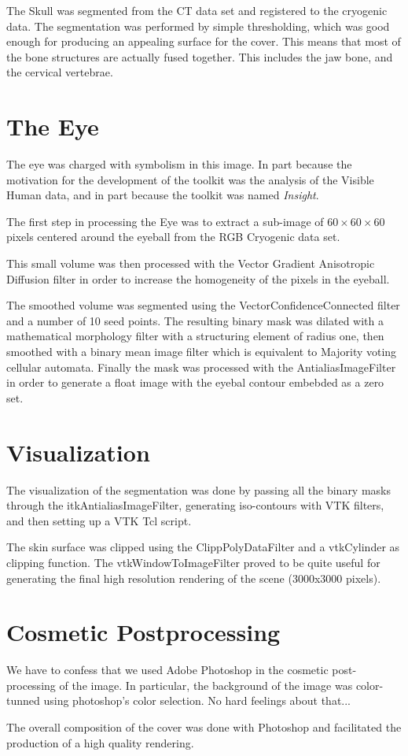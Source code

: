 The Skull was segmented from the CT data set and registered to the cryogenic
data. The segmentation was performed by simple thresholding, which was good
enough for producing an appealing surface for the cover. This means that most
of the bone structures are actually fused together. This includes the jaw bone,
and the cervical vertebrae.

\section*{The Eye} 

The eye was charged with symbolism in this image. In part because the
motivation for the development of the toolkit was the analysis of the Visible
Human data, and in part because the toolkit was named \emph{Insight}.

The first step in processing the Eye was to extract a sub-image of
$60\times60\times60$ pixels centered around the eyeball from the RGB Cryogenic
data set.

This small volume was then processed with the Vector Gradient Anisotropic
Diffusion filter in order to increase the homogeneity of the pixels in the 
eyeball.

The smoothed volume was segmented using the VectorConfidenceConnected filter
and a number of 10 seed points. The resulting binary mask was dilated with 
a mathematical morphology filter with a structuring element of radius one, then
smoothed with a binary mean image filter which is equivalent to Majority voting
cellular automata. Finally the mask was processed with the AntialiasImageFilter
in order to generate a float image with the eyebal contour embebded as a zero
set.


\section*{Visualization}

The visualization of the segmentation was done by passing all the binary masks
through the itkAntialiasImageFilter, generating iso-contours with VTK filters,
and then setting up a VTK Tcl script.

The skin surface was clipped using the ClippPolyDataFilter and a vtkCylinder
as clipping function. The vtkWindowToImageFilter proved to be quite useful for
generating the final high resolution rendering of the scene (3000x3000 pixels).


\section*{Cosmetic Postprocessing}

We have to confess that we used Adobe Photoshop in the cosmetic post-processing of
the image. In particular, the background of the image was color-tunned using
photoshop's color selection. No hard feelings about that...

The overall composition of the cover was done with Photoshop and facilitated
the production of a high quality rendering.

